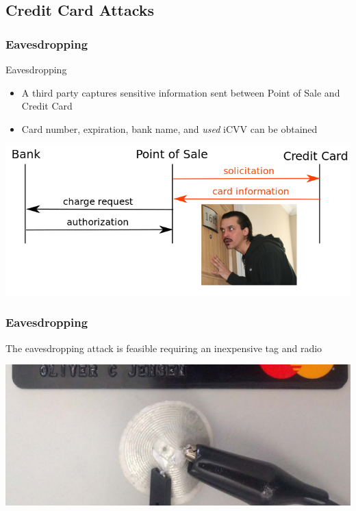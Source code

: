 \documentclass[unknownkeysallowed]{beamer}
\begin{document}
\subsection{Credit Card Attacks}
\begin{frame}
\frametitle{Eavesdropping}\centering
     \begin{minipage}{.7\textwidth}
              \begin{block}{Eavesdropping}
                \begin{itemize}
                  \item{A third party captures sensitive information sent between Point of Sale and Credit Card}
                  \item<2->{Card number, expiration, bank name, and \textit{used} iCVV can be obtained}
                \end{itemize}
              \end{block}
              \begin{center}
                \includegraphics[width=.7\linewidth,height=\textheight,keepaspectratio]{figures/CCeaves.png}
              \end{center}
     \end{minipage}
\end{frame}

\begin{frame}
\frametitle{Eavesdropping}\centering
     \begin{minipage}{.7\textwidth}
          The eavesdropping attack is feasible requiring an inexpensive tag and radio
              \begin{center}
                \includegraphics[width=.7\linewidth,height=\textheight,keepaspectratio]{../TomPaper/figures/eavesdroppingAntenna.png}
              \end{center}
     \end{minipage}
\end{frame}
\end{document}
